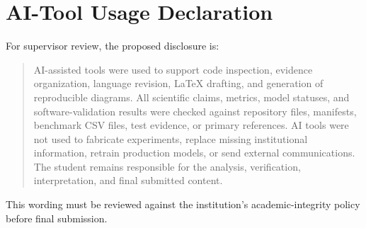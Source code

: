 \chapter{AI-Tool Usage Declaration}
\label{app:aideclaration}


For supervisor review, the proposed disclosure is:

\begin{quote}
AI-assisted tools were used to support code inspection, evidence organization, language revision, LaTeX drafting, and generation of reproducible diagrams. All scientific claims, metrics, model statuses, and software-validation results were checked against repository files, manifests, benchmark CSV files, test evidence, or primary references. AI tools were not used to fabricate experiments, replace missing institutional information, retrain production models, or send external communications. The student remains responsible for the analysis, verification, interpretation, and final submitted content.
\end{quote}

This wording must be reviewed against the institution's academic-integrity policy before final submission.
